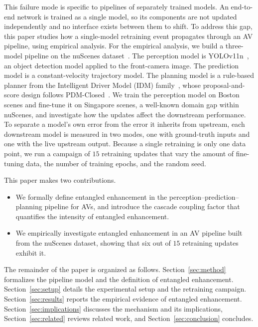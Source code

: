 \documentclass[conference]{IEEEtran}
\begin{document}
This failure mode is specific to pipelines of separately trained models. An end-to-end network is trained as a single model, so its components are not updated independently and no interface exists between them to shift. To address this gap, this paper studies how a single-model retraining event
propagates through an AV pipeline, using empirical analysis. For the empirical analysis, we build a three-model pipeline on the nuScenes
dataset~\cite{caesar2020nuscenes}. The perception model is
YOLOv11n~\cite{jocher2024yolo11}, an object detection model applied to the front-camera
image. The prediction model is a constant-velocity trajectory model. The
planning model is a rule-based planner from the Intelligent Driver Model (IDM)
family~\cite{treiber2000idm}, whose proposal-and-score design follows
PDM-Closed~\cite{dauner2023parting}. We train the perception model on Boston
scenes and fine-tune it on Singapore scenes, a well-known domain gap within
nuScenes, and investigate how the updates affect the downstream performance. To separate a
model's own error from the error it inherits from upstream, each downstream model
is measured in two modes, one with ground-truth inputs and one with the live
upstream output. Because a single retraining is only one data point, we run a
campaign of $15$ retraining updates that vary the amount of fine-tuning data, the
number of training epochs, and the random seed.

\vspace{2pt}
This paper makes two contributions.
\begin{itemize}[leftmargin=*, itemsep=2pt, topsep=2pt]
\item We formally define entangled enhancement in the
perception--prediction--planning pipeline for AVs, and introduce the cascade coupling factor that quantifies the intensity of entangled enhancement.

\item We empirically investigate entangled enhancement in an AV pipeline built from the nuScenes dataset, showing that six out of $15$ retraining updates exhibit it.
\end{itemize}

The remainder of the paper is organized as follows.
Section~\ref{sec:method} formalizes the pipeline model and the definition of
entangled enhancement.
Section~\ref{sec:setup} details the experimental setup and the retraining
campaign. Section~\ref{sec:results} reports the empirical evidence of entangled
enhancement.
Section~\ref{sec:implications} discusses the mechanism and its implications,
Section~\ref{sec:related} reviews related work, and
Section~\ref{sec:conclusion} concludes.
\end{document}
